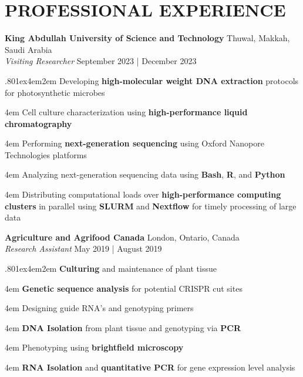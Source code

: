 \documentclass[a4paper,9pt]{extarticle}
\begin{document}
\section*{PROFESSIONAL EXPERIENCE}
\begin{minipage}{1\textwidth} 
\setlength{\parindent}{15pt} %
\noindent
	\textbf{King Abdullah University of Science and Technology} \hfill Thuwal, Makkah, Saudi Arabia\\ %
	\textit{Visiting Researcher} \hfill September 2023 | December 2023 \par %
	{\hsize.80\linewidth\parskip1ex\hangindent4em\parindent2em 
	\setlength{\parskip}{0pt} %
		Developing \textbf{high-molecular weight DNA extraction} protocols for photosynthetic microbes\par
		\hangindent4em
		Cell culture characterization using \textbf{high-performance liquid chromatography}\par
		\hangindent4em
		Performing \textbf{next-generation sequencing} using Oxford Nanopore Technologies platforms\par
		\hangindent4em
		Analyzing next-generation sequencing data using \textbf{Bash}, \textbf{R}, and \textbf{Python}\par
		\hangindent4em
		Distributing computational loads over \textbf{high-performance computing clusters} in parallel using \textbf{SLURM} and \textbf{Nextflow} for timely processing of large data\par}
\end{minipage}
\vspace{\parskip}

\noindent
\begin{minipage}{1\textwidth}
\setlength{\parindent}{15pt} %
	\noindent
	\textbf{Agriculture and Agrifood Canada} \hfill London, Ontario, Canada\\ %
	\textit{Research Assistant} \hfill May 2019 | August 2019  \par %
	{\hsize.80\linewidth\parskip1ex\hangindent4em\parindent2em 
	\setlength{\parskip}{0pt} %
		\textbf{Culturing} and maintenance of plant tissue\par
		\hangindent4em
		\textbf{Genetic sequence analysis} for potential CRISPR cut sites\par
		\hangindent4em
		Designing guide RNA's and genotyping primers\par
		\hangindent4em
		\textbf{DNA Isolation} from plant tissue and genotyping via \textbf{PCR}\par
		\hangindent4em
		Phenotyping using \textbf{brightfield microscopy}\par
		\hangindent4em
		\textbf{RNA Isolation} and \textbf{quantitative PCR} for gene expression level analysis\par}
\end{minipage}
\vspace{\parskip}
\end{document}
